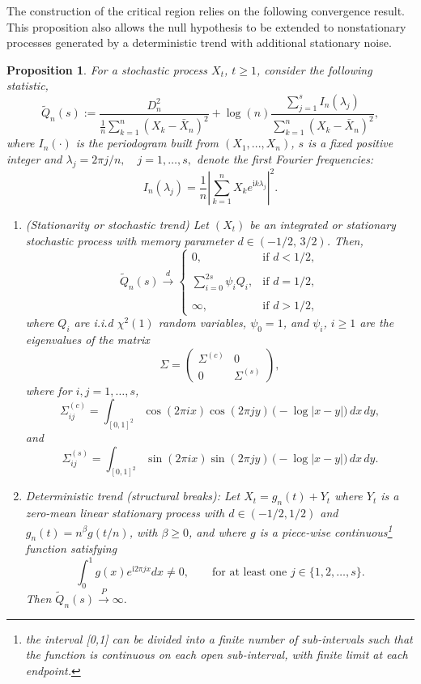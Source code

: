 \documentclass[10pt,a4paper]{amsart}
\numberwithin{equation}{section}
\newtheorem{prop}{Proposition}[section]
\def\i{\mathrm{i}}
\begin{document}
The construction of the critical region relies on the following convergence result. This proposition also allows the null hypothesis to be extended to nonstationary processes generated by a deterministic trend with additional stationary noise.
\begin{prop}\label{periodogram variance}
 For a stochastic process $X_t$, $t\ge1$, consider the following statistic,
 $$
 \tilde Q_n(s):=\frac{D_n^2}{\frac{1}{n}{\displaystyle\sum_{k=1}^n(X_k-\bar X_n)^2}}
  +\log (n)\displaystyle\frac{\sum_{j=1}^sI_n(\lambda_j)}{\displaystyle\sum_{k=1}^n(X_k-\bar X_n)^2},
 $$
where $I_n(\cdot)$ is the periodogram  built from $(X_1,...,X_n)$,  $s$ is a fixed positive integer and $ \lambda_j=2\pi j/n, \quad j=1,\ldots,s,$ denote the first Fourier frequencies:
\begin{equation}\label{non standard perio}
I_n(\lambda_j)=\frac{1}{n}\left\vert\sum_{k=1}^nX_ke^{\i k\lambda_j}\right\vert^2.
\end{equation}

\begin{enumerate}
    \item (Stationarity or stochastic trend)
Let $(X_t)$ be an integrated or stationary  stochastic process with memory parameter $d \in (-1/2,\,3/2)$. Then, 
$$
\tilde Q_n(s)\overset{d}{\rightarrow}\begin{cases}
0,&\textrm{if }d<1/2,\\\\
\displaystyle\sum_{i=0}^{2s}\psi_iQ_i,&\textrm{if }d=1/2,\\\\
\infty,&\textrm{if }d>1/2,
\end{cases}
$$
where $Q_i$ are i.i.d $\chi^2(1)$ random variables, $\psi_0=1$, and $\psi_i$, $i\ge1$ are the eigenvalues of the matrix
\begin{equation}\label{Sigma variance}
\Sigma =
\begin{pmatrix}
\Sigma^{(c)} & 0\\[3pt]
0 &\Sigma^{(s)}
\end{pmatrix},
\end{equation}
where for 
 $i,j=1,\ldots,s$, 
\[
\Sigma^{(c)}_{ij} =
\int_{[0,1]^2}\!\cos(2\pi i x)\cos(2\pi j y)\,
\bigl(-\log|x-y|\bigr)\,dx\,dy,
\]
and
$$
\Sigma^{(s)}_{ij} =
\int_{[0,1]^2}\!\sin(2\pi i x)\sin(2\pi j y)\,
\bigl(-\log|x-y|\bigr)\,dx\,dy.
$$
\item Deterministic trend (structural breaks):  Let $X_t=g_n(t)+Y_t$ where  $Y_t$ is a zero-mean linear stationary process with $d\in(-1/2,1/2)$ and $g_n(t)=n^\beta g(t/n)$, with $\beta\ge0$, and where $g$ is a piece-wise continuous\footnote{the interval [0,1] can be divided into a finite number of sub-intervals such that the function is continuous on each open sub-interval, with finite limit at each endpoint.}   function satisfying  
\begin{equation}\label{nonzero}
\int_0^1g(x)e^{\i 2\pi jx}dx\neq0, \qquad\textrm{for at least one }j\in\{1,2,\ldots,s\}.
\end{equation}
Then $\tilde Q_n(s)\overset{P}{\to}\infty.$
\end{enumerate}
\end{prop}
\end{document}
